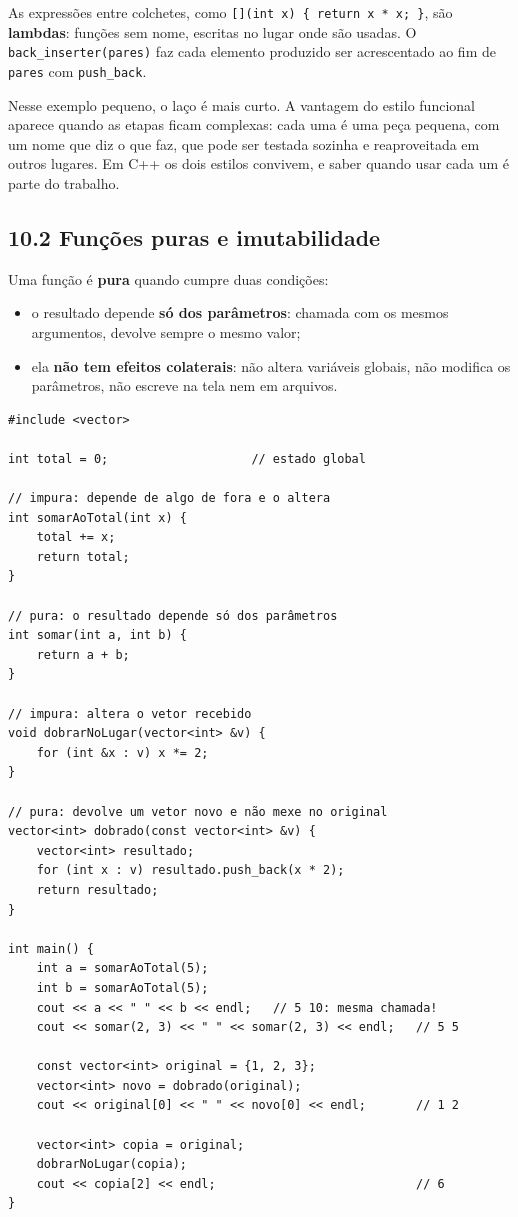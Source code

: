 As expressões entre colchetes, como \texttt{[](int x) \{ return x * x; \}}, são \textbf{lambdas}: funções sem nome, escritas no lugar onde são usadas. O \texttt{back\_inserter(pares)} faz cada elemento produzido ser acrescentado ao fim de \texttt{pares} com \texttt{push\_back}.

Nesse exemplo pequeno, o laço é mais curto. A vantagem do estilo funcional aparece quando as etapas ficam complexas: cada uma é uma peça pequena, com um nome que diz o que faz, que pode ser testada sozinha e reaproveitada em outros lugares. Em C++ os dois estilos convivem, e saber quando usar cada um é parte do trabalho.

\subsection{10.2 Funções puras e imutabilidade}

Uma função é \textbf{pura} quando cumpre duas condições:

\begin{itemize}
  \item o resultado depende \textbf{só dos parâmetros}: chamada com os mesmos argumentos, devolve sempre o mesmo valor;
  \item ela \textbf{não tem efeitos colaterais}: não altera variáveis globais, não modifica os parâmetros, não escreve na tela nem em arquivos.
\end{itemize}

\begin{codigo}
\begin{Verbatim}[breaklines=true, breaksymbolleft={}, fontsize=\footnotesize]
#include <vector>

int total = 0;                    // estado global

// impura: depende de algo de fora e o altera
int somarAoTotal(int x) {
    total += x;
    return total;
}

// pura: o resultado depende só dos parâmetros
int somar(int a, int b) {
    return a + b;
}

// impura: altera o vetor recebido
void dobrarNoLugar(vector<int> &v) {
    for (int &x : v) x *= 2;
}

// pura: devolve um vetor novo e não mexe no original
vector<int> dobrado(const vector<int> &v) {
    vector<int> resultado;
    for (int x : v) resultado.push_back(x * 2);
    return resultado;
}

int main() {
    int a = somarAoTotal(5);
    int b = somarAoTotal(5);
    cout << a << " " << b << endl;   // 5 10: mesma chamada!
    cout << somar(2, 3) << " " << somar(2, 3) << endl;   // 5 5

    const vector<int> original = {1, 2, 3};
    vector<int> novo = dobrado(original);
    cout << original[0] << " " << novo[0] << endl;       // 1 2

    vector<int> copia = original;
    dobrarNoLugar(copia);
    cout << copia[2] << endl;                            // 6
}
\end{Verbatim}
\end{codigo}

